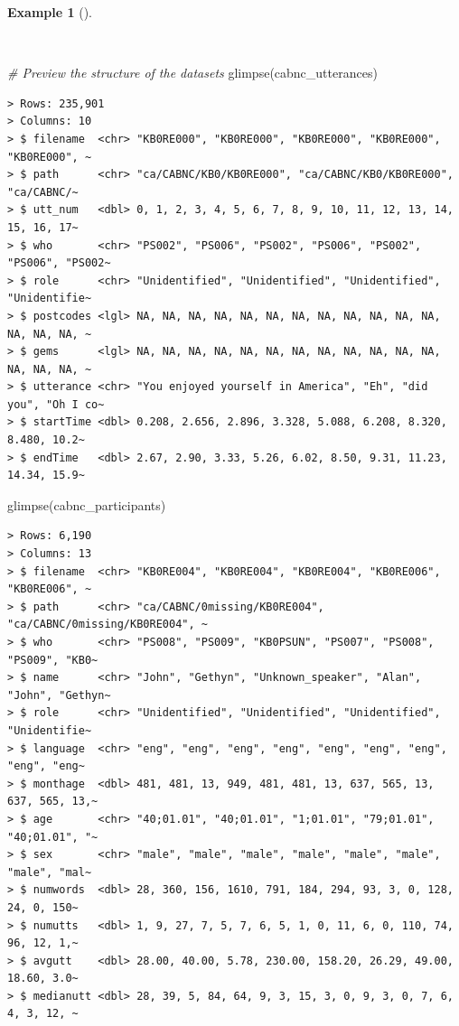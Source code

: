 \documentclass[
  letterpaper,
]{latex/krantz}
\newenvironment{Shaded}{\begin{snugshade}}{\end{snugshade}}
\newcommand{\CommentTok}[1]{\textcolor[rgb]{0.00,0.00,0.00}{\textit{#1}}}
\newcommand{\FunctionTok}[1]{\textcolor[rgb]{0.00,0.00,0.00}{#1}}
\newcommand{\NormalTok}[1]{\textcolor[rgb]{0.00,0.00,0.00}{#1}}
\theoremstyle{definition}
\newtheorem{example}{Example}[chapter]
\theoremstyle{remark}
\begin{document}
\begin{example}[]\protect\hypertarget{exm-cd-cabnc-glimpse}{}\label{exm-cd-cabnc-glimpse}

~

\begin{Shaded}
\begin{Highlighting}[]
\CommentTok{\# Preview the structure of the datasets}
\FunctionTok{glimpse}\NormalTok{(cabnc\_utterances)}
\end{Highlighting}
\end{Shaded}

\begin{verbatim}
> Rows: 235,901
> Columns: 10
> $ filename  <chr> "KB0RE000", "KB0RE000", "KB0RE000", "KB0RE000", "KB0RE000", ~
> $ path      <chr> "ca/CABNC/KB0/KB0RE000", "ca/CABNC/KB0/KB0RE000", "ca/CABNC/~
> $ utt_num   <dbl> 0, 1, 2, 3, 4, 5, 6, 7, 8, 9, 10, 11, 12, 13, 14, 15, 16, 17~
> $ who       <chr> "PS002", "PS006", "PS002", "PS006", "PS002", "PS006", "PS002~
> $ role      <chr> "Unidentified", "Unidentified", "Unidentified", "Unidentifie~
> $ postcodes <lgl> NA, NA, NA, NA, NA, NA, NA, NA, NA, NA, NA, NA, NA, NA, NA, ~
> $ gems      <lgl> NA, NA, NA, NA, NA, NA, NA, NA, NA, NA, NA, NA, NA, NA, NA, ~
> $ utterance <chr> "You enjoyed yourself in America", "Eh", "did you", "Oh I co~
> $ startTime <dbl> 0.208, 2.656, 2.896, 3.328, 5.088, 6.208, 8.320, 8.480, 10.2~
> $ endTime   <dbl> 2.67, 2.90, 3.33, 5.26, 6.02, 8.50, 9.31, 11.23, 14.34, 15.9~
\end{verbatim}

\begin{Shaded}
\begin{Highlighting}[]
\FunctionTok{glimpse}\NormalTok{(cabnc\_participants)}
\end{Highlighting}
\end{Shaded}

\begin{verbatim}
> Rows: 6,190
> Columns: 13
> $ filename  <chr> "KB0RE004", "KB0RE004", "KB0RE004", "KB0RE006", "KB0RE006", ~
> $ path      <chr> "ca/CABNC/0missing/KB0RE004", "ca/CABNC/0missing/KB0RE004", ~
> $ who       <chr> "PS008", "PS009", "KB0PSUN", "PS007", "PS008", "PS009", "KB0~
> $ name      <chr> "John", "Gethyn", "Unknown_speaker", "Alan", "John", "Gethyn~
> $ role      <chr> "Unidentified", "Unidentified", "Unidentified", "Unidentifie~
> $ language  <chr> "eng", "eng", "eng", "eng", "eng", "eng", "eng", "eng", "eng~
> $ monthage  <dbl> 481, 481, 13, 949, 481, 481, 13, 637, 565, 13, 637, 565, 13,~
> $ age       <chr> "40;01.01", "40;01.01", "1;01.01", "79;01.01", "40;01.01", "~
> $ sex       <chr> "male", "male", "male", "male", "male", "male", "male", "mal~
> $ numwords  <dbl> 28, 360, 156, 1610, 791, 184, 294, 93, 3, 0, 128, 24, 0, 150~
> $ numutts   <dbl> 1, 9, 27, 7, 5, 7, 6, 5, 1, 0, 11, 6, 0, 110, 74, 96, 12, 1,~
> $ avgutt    <dbl> 28.00, 40.00, 5.78, 230.00, 158.20, 26.29, 49.00, 18.60, 3.0~
> $ medianutt <dbl> 28, 39, 5, 84, 64, 9, 3, 15, 3, 0, 9, 3, 0, 7, 6, 4, 3, 12, ~
\end{verbatim}

\end{example}
\end{document}
